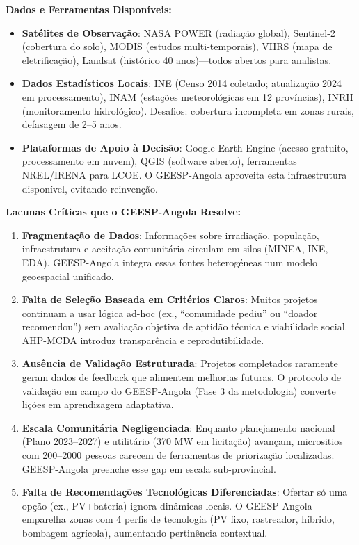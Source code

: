 \documentclass[12pt, a4paper]{article}
\begin{document}
\textbf{Dados e Ferramentas Disponíveis:}
\begin{itemize}
\item \textbf{Satélites de Observação}: NASA POWER (radiação global), Sentinel-2 (cobertura do solo), MODIS (estudos multi-temporais), VIIRS (mapa de eletrificação), Landsat (histórico 40 anos)—todos abertos para analistas.
\item \textbf{Dados Estadísticos Locais}: INE (Censo 2014 coletado; atualização 2024 em processamento), INAM (estações meteorológicas em 12 províncias), INRH (monitoramento hidrológico). Desafios: cobertura incompleta em zonas rurais, defasagem de 2--5 anos.
\item \textbf{Plataformas de Apoio à Decisão}: Google Earth Engine (acesso gratuito, processamento em nuvem), QGIS (software aberto), ferramentas NREL/IRENA para LCOE. O GEESP-Angola aproveita esta infraestrutura disponível, evitando reinvenção.
\end{itemize}

\textbf{Lacunas Críticas que o GEESP-Angola Resolve:}
\begin{enumerate}
\item \textbf{Fragmentação de Dados}: Informações sobre irradiação, população, infraestrutura e aceitação comunitária circulam em silos (MINEA, INE, EDA). GEESP-Angola integra essas fontes heterogéneas num modelo geoespacial unificado.
\item \textbf{Falta de Seleção Baseada em Critérios Claros}: Muitos projetos continuam a usar lógica ad-hoc (ex., ``comunidade pediu'' ou ``doador recomendou'') sem avaliação objetiva de aptidão técnica e viabilidade social. AHP-MCDA introduz transparência e reprodutibilidade.
\item \textbf{Ausência de Validação Estruturada}: Projetos completados raramente geram dados de feedback que alimentem melhorias futuras. O protocolo de validação em campo do GEESP-Angola (Fase 3 da metodologia) converte lições em aprendizagem adaptativa.
\item \textbf{Escala Comunitária Negligenciada}: Enquanto planejamento nacional (Plano 2023–2027) e utilitário (370 MW em licitação) avançam, micrositios com 200--2000 pessoas carecem de ferramentas de priorização localizadas. GEESP-Angola preenche esse gap em escala sub-provincial.
\item \textbf{Falta de Recomendações Tecnológicas Diferenciadas}: Ofertar só uma opção (ex., PV+bateria) ignora dinâmicas locais. O GEESP-Angola emparelha zonas com 4 perfis de tecnologia (PV fixo, rastreador, híbrido, bombagem agrícola), aumentando pertinência contextual.
\end{enumerate}
\end{document}

